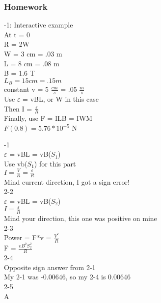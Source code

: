 \documentclass{article}
\begin{document}
\subsubsection{Homework}
-1: Interactive example \\
At t = 0 \\
R = 2W \\
W = 3 cm = .03 m \\
L = 8 cm = .08 m \\
B = 1.6 T \\
$L_B = 15 cm = .15 m$ \\
constant v = 5 $\frac{cm}{s}$ = .05 $\frac{m}{s}$ \\
Use $\varepsilon$ = vBL, or W in this case \\
Then I = $\frac{\varepsilon}{R}$ \\
Finally, use F = ILB = IWM \\
$F(0.8) = 5.76*10^{-5}$ N 

\vspace{2mm}

-1 \\
$\varepsilon$ = vBL = vB($S_1$) \\
Use vb($S_1$) for this part \\
$I = \frac{V}{R} = \frac{\varepsilon}{R}$ \\
Mind current direction, I got a sign error! \\
2-2 \\
$\varepsilon$ = vBL = vB($S_2$) \\
$I = \frac{\varepsilon}{R}$ \\
Mind your direction, this one was positive on mine \\
2-3 \\
Power = F*v = $\frac{V^2}{R}$ \\
F = $\frac{v B^2 S_2^2}{R} $ \\
2-4 \\
Opposite sign answer from 2-1 \\
My 2-1 was -0.00646, so my 2-4 is 0.00646 \\
2-5 \\
A

\vspace{2mm}
\end{document}
